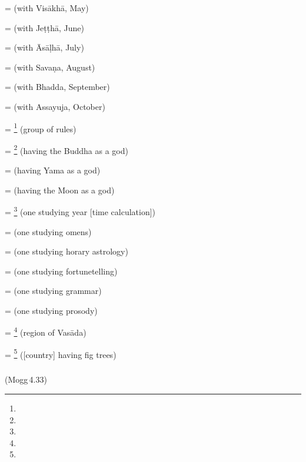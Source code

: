  =  (with Vis\=akh\=a, May) \par
{} =  (with Je\d t\d th\=a, June) \par
{} =  (with \=As\=a\d lh\=a, July) \par
{} =  (with Sava\d na, August) \par
{} =  (with Bhadda, September) \par
{} =  (with Assayuja, October) \par
{} = \footnote{} (group of rules) \par
{} = \footnote{} (having the Buddha as a god) \par
{} =  (having Yama as a god) \par
{} =  (having the Moon as a god) \par
{} = \footnote{} (one studying year [time calculation]) \par
{} =  (one studying omens) \par
{} =  (one studying horary astrology) \par
{} =  (one studying fortunetelling) \par
{} =  (one studying grammar) \par
{} =  (one studying prosody) \par
{} = \footnote{} (region of Vas\=ada) \par
{} = \footnote{} ([country] having fig trees) \par

\subparagraph*{} (Mogg\,4.33)\label{pacct3:dnika}\label{pacct3:kiya}\label{pacct3:niya}\label{pacct3:ka}

